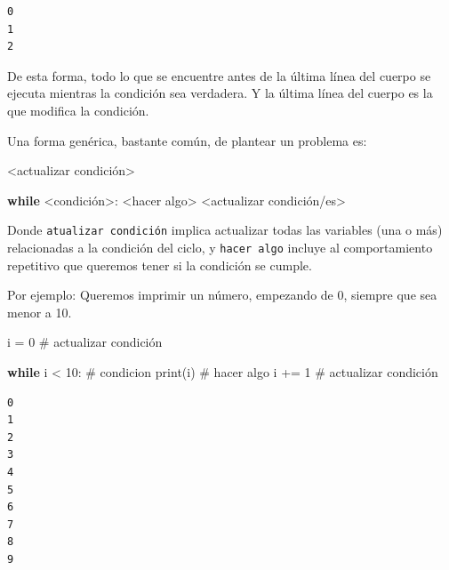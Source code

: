 \documentclass[
  letterpaper,
  DIV=11,
  numbers=noendperiod]{scrreprt}
\newenvironment{Shaded}{\begin{snugshade}}{\end{snugshade}}
\newcommand{\BuiltInTok}[1]{\textcolor[rgb]{0.00,0.23,0.31}{#1}}
\newcommand{\CommentTok}[1]{\textcolor[rgb]{0.37,0.37,0.37}{#1}}
\newcommand{\ControlFlowTok}[1]{\textcolor[rgb]{0.00,0.23,0.31}{\textbf{#1}}}
\newcommand{\DecValTok}[1]{\textcolor[rgb]{0.68,0.00,0.00}{#1}}
\newcommand{\NormalTok}[1]{\textcolor[rgb]{0.00,0.23,0.31}{#1}}
\newcommand{\OperatorTok}[1]{\textcolor[rgb]{0.37,0.37,0.37}{#1}}
\begin{document}
\begin{verbatim}
0
1
2
\end{verbatim}

De esta forma, todo lo que se encuentre antes de la última línea del
cuerpo se ejecuta mientras la condición sea verdadera. Y la última línea
del cuerpo es la que modifica la condición.

Una forma genérica, bastante común, de plantear un problema es:

\begin{Shaded}
\begin{Highlighting}[]
\OperatorTok{\textless{}}\NormalTok{actualizar condición}\OperatorTok{\textgreater{}}

\ControlFlowTok{while} \OperatorTok{\textless{}}\NormalTok{condición}\OperatorTok{\textgreater{}}\NormalTok{:}
  \OperatorTok{\textless{}}\NormalTok{hacer algo}\OperatorTok{\textgreater{}}
  \OperatorTok{\textless{}}\NormalTok{actualizar condición}\OperatorTok{/}\NormalTok{es}\OperatorTok{\textgreater{}}
\end{Highlighting}
\end{Shaded}

Donde \texttt{atualizar\ condición} implica actualizar todas las
variables (una o más) relacionadas a la condición del ciclo, y
\texttt{hacer\ algo} incluye al comportamiento repetitivo que queremos
tener si la condición se cumple.

Por ejemplo: Queremos imprimir un número, empezando de 0, siempre que
sea menor a 10.

\begin{Shaded}
\begin{Highlighting}[]
\NormalTok{i }\OperatorTok{=} \DecValTok{0} \CommentTok{\# actualizar condición}

\ControlFlowTok{while}\NormalTok{ i }\OperatorTok{\textless{}} \DecValTok{10}\NormalTok{: }\CommentTok{\# condicion}
  \BuiltInTok{print}\NormalTok{(i) }\CommentTok{\# hacer algo}
\NormalTok{  i }\OperatorTok{+=} \DecValTok{1} \CommentTok{\# actualizar condición}
\end{Highlighting}
\end{Shaded}

\begin{verbatim}
0
1
2
3
4
5
6
7
8
9
\end{verbatim}

\hfill\break
\hfill\break
\end{document}

